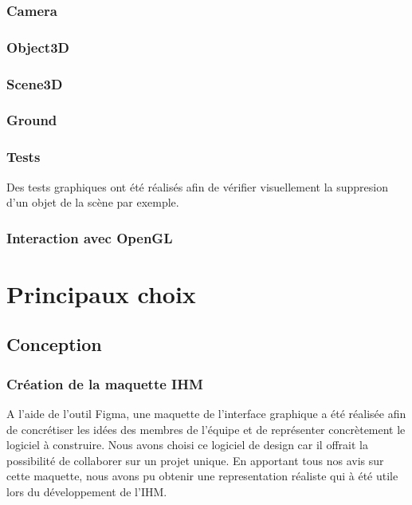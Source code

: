 \documentclass[11pt]{report}
\begin{document}
\subsection{Camera}

\subsection{Object3D}

\subsection{Scene3D}

\subsection{Ground}

\subsection{Tests}
Des tests graphiques ont été réalisés afin de vérifier visuellement la suppresion d'un objet de la scène par exemple.

\subsection{Interaction avec OpenGL}

\chapter{Principaux choix}

\section{Conception}

\subsection{Création de la maquette IHM}

A l'aide de l'outil Figma, une maquette de l'interface graphique a été réalisée afin de concrétiser les idées des membres de l'équipe
et de représenter concrètement le logiciel à construire. Nous avons choisi ce logiciel de design car il offrait la possibilité de
collaborer sur un projet unique. En apportant tous nos avis sur cette maquette, nous avons pu obtenir une representation réaliste qui à
été utile lors du développement de l'IHM.
\end{document}
